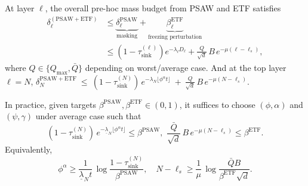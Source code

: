 At layer $\ell$, the overall pre-hoc mass budget from PSAW and ETF satisfies
\begin{equation}
\begin{aligned}
\delta^{\mathrm{(PSAW+ETF)}}_\ell
& \le
\underbrace{\delta^{\mathrm{PSAW}}_\ell}_{\text{masking}}
+
\underbrace{\beta^{\mathrm{ETF}}_\ell}_{\text{freezing perturbation}} \\
& \le
(1-\tau^{(\ell)}_{\mathrm{sink}})e^{-\lambda_\ell D_\ell} +
\frac{Q}{\sqrt d}\,B\,e^{-\mu(\ell-\ell_s)},  
\end{aligned}
\end{equation}
where $Q\in\{Q_{\max},\bar Q\}$ depending on worst/average case. And at the top layer $\ell=N$,
$\delta^{\mathrm{PSAW+ETF}}_N
\ \le\
(1-\tau^{(N)}_{\mathrm{sink}})\,e^{-\lambda_N \lfloor \phi^\alpha t\rfloor}
\ +\
\frac{Q}{\sqrt d}\,B\,e^{-\mu(N-\ell_s)}.$

In practice, given targets $\beta^{\mathrm{PSAW}},\beta^{\mathrm{ETF}}\in(0,1)$, it suffices to choose
$(\phi,\alpha)$ and $(\psi,\gamma)$ under average case such that
\[
(1-\tau^{(N)}_{\mathrm{sink}})\,e^{-\underline{\lambda}_N \lfloor \phi^\alpha t\rfloor}
\le \beta^{\mathrm{PSAW}},
\,\,
\frac{\bar Q}{\sqrt d}\,B\,e^{-\mu(N-\ell_s)}
\le \beta^{\mathrm{ETF}}.
\]
Equivalently,
\[
\phi^\alpha
\ge
\frac{1}{\underline{\lambda}_N t}\,\log\!\frac{1-\tau^{(N)}_{\mathrm{sink}}}{\beta^{\mathrm{PSAW}}},
\quad
N-\ell_s
\ge
\frac{1}{\mu}\,\log\!\frac{\bar Q B}{\beta^{\mathrm{ETF}}\sqrt d}.
\]